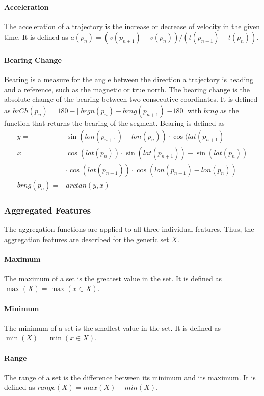 \paragraph{Acceleration} The acceleration of a trajectory is the increase or decrease of velocity in the given time. It is defined as $ a(p_n) = (v(p_{n+1}) - v(p_n))/(t(p_{n+1}) - t(p_n))$. \cite{Zheng2008}

\paragraph{Bearing Change} Bearing is a measure for the angle between the direction a trajectory is heading and a reference, such as the magnetic or true north. The bearing change is the absolute change of the bearing between two consecutive coordinates. It is defined as $ brCh(p_n) = 180 - | |brgn(p_n) - brng(p_{n+1})
| - 180| $ with $brng$ as the function that returns the bearing of the segment. \cite{Dabiri2018} Bearing is defined as
\begin{align*}
            y =& \sin (lon(p_{n+1})-lon(p_n)) \cdot \cos(lat(p_{n+1}) \\ 
            x =& \cos (lat(p_n)) \cdot \sin (lat(p_{n+1}))-\sin (lat(p_n))\\
               & \cdot \cos (lat(p_{n+1})) \cdot \cos(lon(p_{n+1})-lon(p_n)) \\
    brng(p_n) =& arctan(y,x)
\end{align*}

\subsubsection{Aggregated Features}
The aggregation functions are applied to all three individual features. Thus, the aggregation features are described for the generic set $X$.

\paragraph{Maximum} The maximum of a set is the greatest value in the set. It is defined as $ \max (X) = \max(x \in X)$.

\paragraph{Minimum} The minimum of a set is the smallest value in the set. It is defined as $ \min (X) = \min (x \in X) $.

\paragraph{Range} The range of a set is the difference between its minimum and its maximum. It is defined as $ range(X) = max(X) - min(X)$.  

